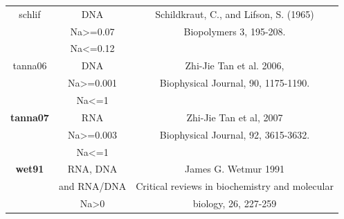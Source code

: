 \documentclass{article}
\begin{document}
\begin{table}[h][c]
\begin{tabular}[h]{| c | c | c |}
 \hline 
schlif & DNA & Schildkraut, C., and Lifson, S. (1965) \\
 & Na>=0.07 & Biopolymers 3, 195-208. \\
 & Na<=0.12 & \\
 \hline
tanna06 & DNA & Zhi-Jie Tan et al. 2006,  \\
 & Na>=0.001 & Biophysical Journal, 90, 1175-1190. \\
 & Na<=1 & \\
 \hline
\textbf{tanna07} & RNA & Zhi-Jie Tan et al, 2007 \\
 & Na>=0.003 & Biophysical Journal, 92, 3615-3632. \\
 & Na<=1 & \\
 \hline
\textbf{wet91} & RNA, DNA & James G. Wetmur 1991 \\
 & and RNA/DNA & Critical reviews in biochemistry and molecular \\
 & Na>0 & biology, 26, 227-259 \\
  \hline
\end{tabular}
\end{table}

\clearpage
\end{document}
